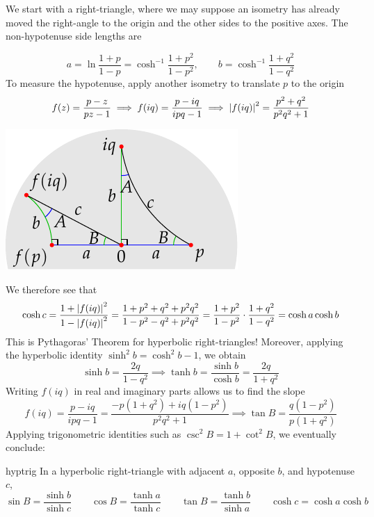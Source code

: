 We start with a right-triangle, where we may suppose an isometry has already moved the right-angle to the origin and the other sides to the positive axes. The non-hypotenuse side lengths are\par
\begin{minipage}[t]{0.675\linewidth}\vspace{-8pt}
	\[
		a=\ln\frac{1+p}{1-p}=\cosh^{-1}\frac{1+p^2}{1-p^2},\qquad b=\cosh^{-1}\frac{1+q^2}{1-q^2}
	\]
	To measure the hypotenuse, apply another isometry to translate $p$ to the origin
	\[
		f(z)=\frac{p-z}{pz-1} \implies f(iq)=\frac{p-iq}{ipq-1} \implies \left| f(iq)\right|^2=\frac{p^2+q^2}{p^2q^2+1}
	\]
\end{minipage}
\hfill
\begin{minipage}[t]{0.3\linewidth}\vspace{0pt}
	\flushright\includegraphics[scale=0.9]{isom-right}
\end{minipage}\medbreak
We therefore see that
\[
	\cosh c=\frac{1+\left| f(iq)\right|^2}{1-\left| f(iq)\right|^2}  =\frac{1+p^2+q^2+p^2q^2}{1-p^2-q^2+p^2q^2} =\frac{1+p^2}{1-p^2}\cdot\frac{1+q^2}{1-q^2} =\cosh a\cosh b
\]
This is Pythagoras' Theorem for hyperbolic right-triangles!\smallbreak
Moreover, applying the hyperbolic identity $\sinh^2b=\cosh^2b-1$, we obtain
\[
	\sinh b=\frac{2q}{1-q^2}\implies \tanh b=\frac{\sinh b}{\cosh b} =\frac{2q}{1+q^2}
\]
Writing $f(iq)$ in real and imaginary parts allows us to find the slope
\[
	f(iq)=\frac{p-iq}{ipq-1} =\frac{-p(1+q^2)+iq(1-p^2)}{p^2q^2+1}\implies \tan B=\frac{q(1-p^2)}{p(1+q^2)}
\]
Applying trigonometric identities such as $\csc^2B=1+\cot^2B$, we eventually conclude:

\begin{thm}{}{hyptrig}
	In a hyperbolic right-triangle with adjacent $a$, opposite $b$, and hypotenuse $c$,
	\[
		\sin B=\frac{\sinh b}{\sinh c}\qquad \cos B=\frac{\tanh a}{\tanh c}\qquad  \tan B=\frac{\tanh b}{\sinh a}\qquad \cosh c=\cosh a\cosh b
	\]
\end{thm}

